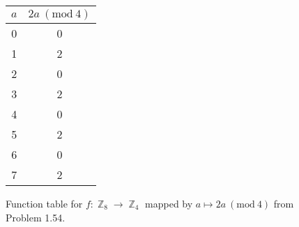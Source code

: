 \documentclass{amsbook}
\renewcommand{\mod}[1]{\ (\mathrm{mod}\ #1)}
\DeclareMathOperator{\Z}{\mathbb{Z}}
\begin{document}
		\begin{figure}[h]
			\begin{tabular}{c|c}
				$a$ & $2a \mod{4}$ \\
				\hline
				0 & 0 \\
				1 & 2 \\
				2 & 0 \\
				3 & 2 \\
				4 & 0 \\
				5 & 2 \\
				6 & 0 \\
				7 & 2
			\end{tabular}
			\caption{Function table for $f:\Z_{8}\to\Z_{4}$ mapped by $a \mapsto 2a \mod{4}$ from Problem 1.54.}
			\label{154f1}
		\end{figure}

	\backmatter
\end{document}
